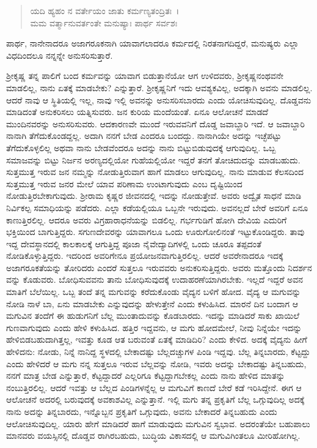 \begin{verse}
ಯದಿ ಹ್ಯಹಂ ನ ವರ್ತೇಯಂ ಜಾತು ಕರ್ಮಣ್ಯತಂದ್ರಿತಃ~।\\ಮಮ ವರ್ತ್ಮಾನುವರ್ತಂತೇ ಮನುಷ್ಯಾಃ ಪಾರ್ಥ ಸರ್ವಶಃ 
\end{verse}

{\small ಪಾರ್ಥ, ನಾನೇನಾದರೂ ಅಜಾಗರೂಕನಾಗಿ ಯಾವಾಗಲಾದರೂ ಕರ್ಮದಲ್ಲಿ ನಿರತನಾಗದಿದ್ದರೆ, ಮನುಷ್ಯರು ಎಲ್ಲಾ ವಿಧದಿಂದಲೂ ನನ್ನನ್ನೇ ಅನುಸರಿಸುತ್ತಾರೆ.}

ಶ‍್ರೀಕೃಷ್ಣ ತನ್ನ ಪಾಲಿಗೆ ಬಂದ ಕರ್ಮವನ್ನು ಯಾವಾಗ ಬಿಡುತ್ತಾನೆಯೋ ಆಗ ಉಳಿದವರು, ಶ‍್ರೀಕೃಷ್ಣನಂಥವನೇ ಮಾಡಲಿಲ್ಲ, ನಾನು ಏತಕ್ಕೆ ಮಾಡಬೇಕು? ಎನ್ನುತ್ತಾರೆ. ಶ‍್ರೀಕೃಷ್ಣನಿಗೆ ಇದು ಆವಶ್ಯಕವಿಲ್ಲ, ಅದಕ್ಕಾಗಿ ಅವನು ಮಾಡಲಿಲ್ಲ. ಆದರೆ ನಾವು ಆ ಸ್ಥಿತಿಯಲ್ಲಿ ಇಲ್ಲ, ನಾವು ಇಲ್ಲಿ ಅವನನ್ನು ಅನುಸರಿಸಬಾರದು ಎಂದು ಯೋಚಿಸುವುದಿಲ್ಲ. ದೊಡ್ಡವನು ಮಾಡಿದಂತೆ ಅನುಕರಿಸಲು ಯತ್ನಿಸುವರು. ಜನ ಕುರಿಯ ಮಂದೆಯಂತೆ. ಏನೂ ಆಲೋಚನೆ ಮಾಡದೆ ಮುಂದಿನವರನ್ನು ಅನುಸರಿಸುವರು. ಆದಕಾರಣವೇ ಮುಂದೆ ಇರುವವನಿಗೆ ದೊಡ್ಡ ಜವಾಬ್ದಾರಿ ಇದೆ. ಆ ಜವಾಬ್ದಾರಿ ನಾನಾಗಿ ತೆಗೆದುಕೊಂಡದ್ದಲ್ಲ. ಅದಾಗಿ ನನಗೆ ಬೇಡ ಎಂದರೂ ಬಂದದ್ದು. ನಾನಾಗಿಯೇ ಅದನ್ನು ಇಚ್ಛೆಪಟ್ಟು ತೆಗೆದುಕೊಳ್ಳಲಿಲ್ಲ ಅಥವಾ ನಾನು ಬೇಡವೆಂದರೂ ಅದನ್ನು ನಾನು ಬಿಟ್ಟುಬಿಡುವುದಕ್ಕೆ ಆಗುವುದಿಲ್ಲ. ಒಬ್ಬ ಸಮಾಜವನ್ನು ಬಿಟ್ಟು ನಿರ್ಜನ ಅರಣ್ಯದಲ್ಲಿಯೋ ಗುಹೆಯಲ್ಲಿಯೋ ಇದ್ದರೆ ತನಗೆ ತೋಚಿದುದನ್ನು ಮಾಡಬಹುದು. ಸುತ್ತಮುತ್ತ ಇರುವ ಜನ ನಮ್ಮನ್ನು ನೋಡುತ್ತಿರುವಾಗ ಹಾಗೆ ಮಾಡಲು ಆಗುವುದಿಲ್ಲ. ನಾನು ಮಾಡುವ ಕೆಲಸದಿಂದ ಸುತ್ತಮುತ್ತ ಇರುವ ಜನರ ಮೇಲೆ ಯಾವ ಪರಿಣಾಮ ಉಂಟಾಗುವುದು ಎಂಬ ದೃಷ್ಟಿಯಿಂದ ನೋಡುತ್ತಿರಬೇಕಾಗುವುದು. ಶ‍್ರೀರಾಮ ಕೃಷ್ಣರ ಜೀವನದಲ್ಲಿ ಇದನ್ನು ನೋಡುತ್ತೇವೆ. ಅವರು ಅದ್ವೈತ ಸಾಧನೆ ಮಾಡಿ ನಿರ್ವಿಕಲ್ಪ ಸಮಾಧಿಯನ್ನು ಪಡೆದರು. ಎಲ್ಲಾ ಕಡೆಯಲ್ಲಿಯೂ ಒಬ್ಬನೇ ಇರುವುದು. ಅವನಲ್ಲದೆ ಬೇರೆ ಅವರಿಗೆ ಏನೂ ಕಾಣುತ್ತಿರಲಿಲ್ಲ. ಆದರೂ ಅವರು ವಿಗ್ರಹಾರಾಧನೆಯನ್ನು ಬಿಡಲಿಲ್ಲ. ಗರ್ಭಗುಡಿಗೆ ಹೋಗಿ ದೇವಿಯ ಎದುರಿಗೆ ಭಕ್ತಿಯಿಂದ ಬಾಗುತ್ತಿದ್ದರು. ಸಗುಣದೇವರನ್ನು ಯಾವಾಗಲೂ ಒಂದು ಊರುಗೋಲಿನಂತೆ ಇಟ್ಟುಕೊಂಡಿದ್ದರು. ತಾವು ಇದ್ದ ದೇವಸ್ಥಾನದಲ್ಲಿ ಕಾಲಕಾಲಕ್ಕೆ ಆಗುತ್ತಿದ್ದ ಪೂಜಾ ನೈವೇದ್ಯಾದಿಗಳಲ್ಲಿ ಒಂದು ಚೂರೂ ತಪ್ಪದಂತೆ ನೋಡಿಕೊಳ್ಳುತ್ತಿದ್ದರು. ಇದರಿಂದ ಅವರಿಗೇನೂ ಪ್ರಯೋಜನವಾಗುತ್ತಿರಲಿಲ್ಲ. ಆದರೆ ಅವರೇನಾದರೂ ಇದಕ್ಕೆ ಅಜಾಗರೂಕತೆಯನ್ನು ತೋರಿದರು ಎಂದರೆ ಸುತ್ತಲೂ ಇರುವವರು ಅನುಕರಿಸುತ್ತಿದ್ದರು. ಅವರು ಮತ್ತೊಂದು ನಿದರ್ಶನ ವನ್ನು ಕೊಡುವರು. ಬೋಧಿಸುವವನು ತಾನು ಬೋಧಿಸುವುದಕ್ಕೆ ಉದಾಹರಣೆಯಾಗಿರಬೇಕು. ಇಲ್ಲದೆ ಇದ್ದರೆ ಅವನ ಮಾತಿಗೆ ಬೆಲೆಯಿಲ್ಲ. ಒಬ್ಬ ತಂದೆ ತನ್ನ ಮಗುವನ್ನು ಕರೆದುಕೊಂಡು ವೈದ್ಯನ ಬಳಿಗೆ ಹೋದ. ವೈದ್ಯ ಆ ಮಗುವನ್ನು ನೋಡಿ ನಾಳೆ ಬಾ, ಏನು ಮಾಡಬೇಕು ಎನ್ನುವುದನ್ನು ಹೇಳುತ್ತೇನೆ ಎಂದು ಕಳುಹಿಸಿದ. ಮಾರನೆ ದಿನ ಬಂದಾಗ ಆ ಮಗುವಿನ ತಂದೆಗೆ ಈ ಹುಡುಗನಿಗೆ ಬೆಲ್ಲ ಮುಂತಾದುವನ್ನು ಕೊಡಬಾರದು. ಇದನ್ನು ಮಾಡಿದರೆ ಸಾಕು ಖಾಯಿಲೆ ಗುಣವಾಗುವುದು ಎಂದು ಹೇಳಿ ಕಳುಹಿಸಿದ. ಹತ್ತಿರ ಇದ್ದವನು, ಆ ಮಗು ಹೋದಮೇಲೆ, ನೀವು ನಿನ್ನೆಯೇ ಇದನ್ನು ಹೇಳಿಬಿಡಬಹುದಾಗಿತ್ತಲ್ಲ, ಇವತ್ತು ಕೂಡ ಆತ ಬರುವಂತೆ ಏತಕ್ಕೆ ಮಾಡಿದಿರಿ? ಎಂದು ಕೇಳಿದ. ಅದಕ್ಕೆ ವೈದ್ಯನು ಹೀಗೆ ಹೇಳಿದನು: ನೋಡು, ನಿನ್ನೆ ನಾನಿದ್ದ ಸ್ಥಳದಲ್ಲಿ ಬೇಕಾದಷ್ಟು ಬೆಲ್ಲದಚ್ಚುಗಳ ಪಿಂಡಿ ಇದ್ದವು. ಬೆಲ್ಲ ತಿನ್ನಬಾರದು, ಕೆಟ್ಟದ್ದು ಎಂದು ಹೇಳಿದರೆ ಆ ಮಗು ನನ್ನ ಸುತ್ತಲೂ ಇರುವ ಬೆಲ್ಲವನ್ನು ನೋಡಿ, ಇವರು ಅದನ್ನು ಬೇಕಾದಷ್ಟು ತಿನ್ನಬಹುದು, ನನಗೆ ಮಾತ್ರ ಬೇಡ ಎನ್ನುತ್ತಾರೆ, ಕೆಟ್ಟದ್ದಾದರೆ ಎಲ್ಲರಿಗೂ ಕೆಟ್ಟದ್ದಾಗಬೇಕಲ್ಲ ಎಂದು ನಾನು ಹೇಳಿದ ಮಾತನ್ನು ನಂಬುತ್ತಿರಲಿಲ್ಲ. ಆದರೆ ಇವತ್ತು ಆ ಬೆಲ್ಲದ ಪಿಂಡಿಗಳನ್ನೆಲ್ಲ ಆ ಮಗುವಿಗೆ ಕಾಣದೆ ಬೇರೆ ಕಡೆ ಇರಿಸಿದ್ದೇನೆ. ಈಗ ಆ ಆಲೋಚನೆ ಅದರಲ್ಲಿ ಬರುವುದಕ್ಕೆ ಅವಕಾಶವಿಲ್ಲ ಎನ್ನುತ್ತಾನೆ. ಇಲ್ಲಿ ಮಗು ತನ್ನ ಪ್ರಕೃತಿಗೆ ಬೆಲ್ಲ ಒಗ್ಗುವುದಿಲ್ಲ ಅದಕ್ಕೆ ನಾನು ಅದನ್ನು ತಿನ್ನಬಾರದು, ಇನ್ನೊಬ್ಬನ ಪ್ರಕೃತಿಗೆ ಒಗ್ಗುವುದು, ಅವನು ಬೇಕಾದರೆ ತಿನ್ನಬಹುದು ಎಂದು ಆಲೋಚಿಸುವುದಿಲ್ಲ. ಯಾರು ಹೇಗೆ ಮಾಡಿದರೆ ಹಾಗೆ ಮಾಡುವುದು ಮಗುವಿನ ಸ್ವಭಾವ. ಅದರಂತೆಯೇ ಬಹುಪಾಲು ಮಾನವರು ವಯಸ್ಸಿನಲ್ಲಿ ದೊಡ್ಡವ ರಾಗಿರಬಹುದು, ಬುದ್ಧಿಯ ವಿಕಾಸದಲ್ಲಿ ಆ ಮಗುವಿಗಿಂತಲೂ ಮೀರಿಹೋಗಿಲ್ಲ.


